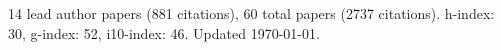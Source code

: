 14 lead author papers (881 citations),
60 total papers (2737 citations).\newline
h-index: 30, g-index: 52, i10-index: 46. Updated \today.